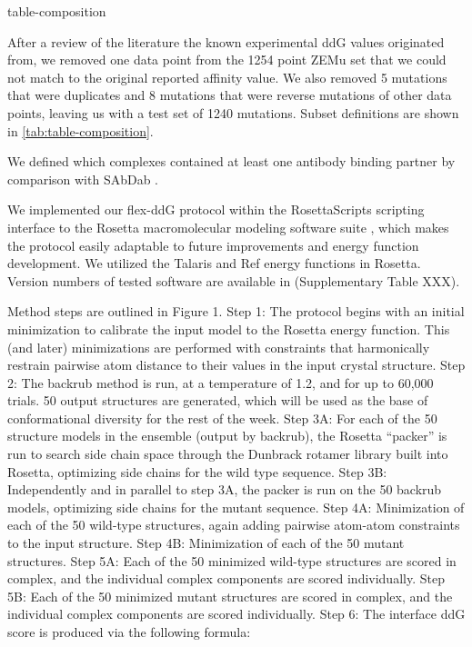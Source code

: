 {table-composition}

After a review of the literature the known experimental ddG values originated from, we removed one data point from the 1254 point ZEMu set that we could not match to the original reported affinity value. We also removed 5 mutations that were duplicates and 8 mutations that were reverse mutations of other data points, leaving us with a test set of 1240 mutations. Subset definitions are shown in \cref{tab:table-composition}.

We defined which complexes contained at least one antibody binding partner by comparison with SAbDab \cite{dunbar_sabdab:_2014}.

We implemented our flex-ddG protocol within the RosettaScripts scripting interface to the Rosetta macromolecular modeling software suite \cite{fleishman_rosettascripts:_2011}, which makes the protocol easily adaptable to future improvements and energy function development. We utilized the Talaris \cite{leaver-fay_chapter_2013,song_structure-guided_2011,shapovalov_smoothed_2011} and Ref\cite{alford_rosetta_2017} energy functions in Rosetta. Version numbers of tested software are available in (Supplementary Table XXX).

Method steps are outlined in Figure 1. Step 1: The protocol begins with an initial minimization to calibrate the input model to the Rosetta energy function. This (and later) minimizations are performed with constraints that harmonically restrain pairwise atom distance to their values in the input crystal structure. Step 2: The backrub method is run, at a temperature of 1.2, and for up to 60,000 trials. 50 output structures are generated, which will be used as the base of conformational diversity for the rest of the week. Step 3A: For each of the 50 structure models in the ensemble (output by backrub), the Rosetta ``packer'' is run to search side chain space through the Dunbrack rotamer library built into Rosetta\cite{shapovalov_smoothed_2011}, optimizing side chains for the wild type sequence. Step 3B: Independently and in parallel to step 3A, the packer is run on the 50 backrub models, optimizing side chains for the mutant sequence. Step 4A: Minimization of each of the 50 wild-type structures, again adding pairwise atom-atom constraints to the input structure. Step 4B: Minimization of each of the 50 mutant structures. Step 5A: Each of the 50 minimized wild-type structures are scored in complex, and the individual complex components are scored individually. Step 5B: Each of the 50 minimized mutant structures are scored in complex, and the individual complex components are scored individually. Step 6: The interface ddG score is produced via the following formula:


